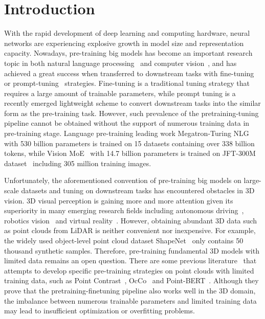 \documentclass{article}
\begin{document}
\section{Introduction}

With the rapid development of deep learning and computing hardware, neural networks are experiencing explosive growth in model size and representation capacity. Nowadays, pre-training big models has become an important research topic in both natural language processing~\cite{devlin2018bert,radford2019language,brown2020gpt3,smith2022MTNLG} and computer vision~\cite{radford2021clip,ramesh2021zero,he2022masked,riquelme2021scaling}, and has achieved a great success when transferred to downstream tasks with fine-tuning~\cite{he2020moco,chen2020mocov2,chen2020simclr,bao2021beit,he2022masked} or prompt-tuning~\cite{radford2021clip,petroni2019lama,wallace2019advtrigger,shin2020autoprompt,lester2021prompttuning,liu2021ptuning} strategies. Fine-tuning is a traditional tuning strategy that requires a large amount of trainable parameters, while prompt tuning is a recently emerged lightweight scheme to convert downstream tasks into the similar form as the pre-training task.  However, such prevalence of the pretraining-tuning pipeline cannot be obtained without the support of numerous training data in pre-training stage. Language pre-training leading work Megatron-Turing NLG~\cite{smith2022MTNLG} with 530 billion parameters is trained on 15 datasets containing over 338 billion tokens, while Vision MoE~\cite{riquelme2021scaling} with 14.7 billion parameters is trained on JFT-300M dataset~\cite{sun2017JFT} including 305 million training images.

Unfortunately, the aforementioned convention of pre-training big models on large-scale datasets and tuning on downstream tasks has encountered obstacles in 3D vision. 3D visual perception is gaining more and more attention given its superiority in many emerging research fields including autonomous driving~\cite{lang2019pointpillars,yin2021center}, robotics vision~\cite{chao2021dexycb, yang2020human2robot} and virtual reality~\cite{ma2021avatars, wei2019vr}. However, obtaining abundant 3D data such as point clouds from LiDAR is neither convenient nor inexpensive. For example, the widely used object-level point cloud dataset ShapeNet~\cite{chang2015shapenet} only contains 50 thousand synthetic samples. Therefore, pre-training fundamental 3D models with limited data remains an open question. There are some previous literature~\cite{xie2020pointcontrast,wang2021occo,yu2022pointbert} that attempts to develop specific pre-training strategies on point clouds with limited training data, such as Point Contrast~\cite{xie2020pointcontrast}, OcCo~\cite{wang2021occo} and Point-BERT~\cite{yu2022pointbert}. Although they prove that the pretraining-finetuning pipeline also works well in the 3D domain, the imbalance between numerous trainable parameters and limited training data may lead to insufficient optimization or overfitting problems.
\end{document}
